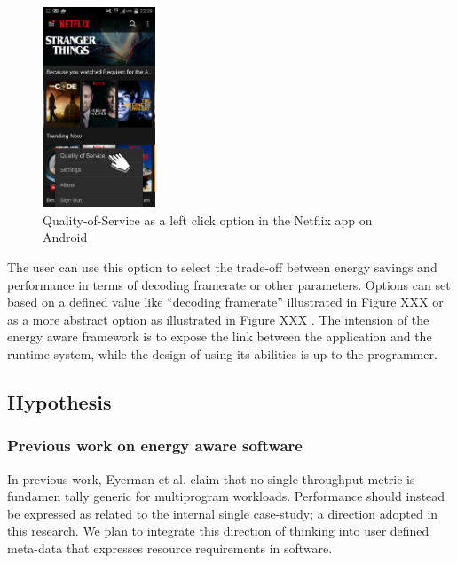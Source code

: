 \documentclass{article}
\begin{document}
\begin{figure}
  \begin{center}
    \includegraphics[width=0.3\textwidth]{fig/netflix.png}
  \end{center}
  \caption{Quality-of-Service as a left click option in the Netflix app on Android}
  \label{fig:netflix}
  \vspace{-2cm}
\end{figure}
The user can use this option to select the trade-off between energy savings and performance in terms of decoding framerate or other parameters. 
Options can set based on a defined value like ``decoding framerate'' illustrated in Figure XXX  or as a more abstract option as illustrated in Figure XXX . 
The intension of the energy aware framework is to expose the link between the application and the runtime system, while the design of using its abilities is up to the programmer.

\subsection{Hypothesis}

\subsubsection{Previous work on energy aware software}
In previous work, Eyerman et al. \cite{Eyerman:09} claim that no single throughput metric is fundamen tally generic for multiprogram workloads. 
Performance should instead be expressed as related to the internal single case-study; a direction adopted in this research. 
We plan to integrate this direction of thinking into user defined meta-data that expresses resource requirements in software.
\end{document}
